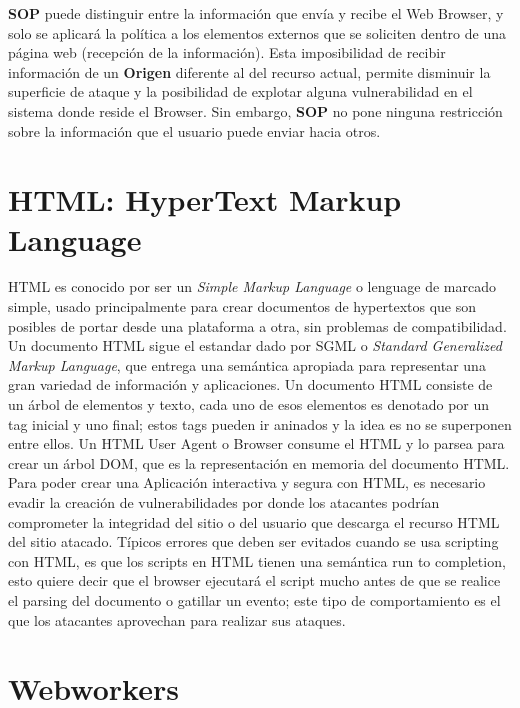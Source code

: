 \textbf{SOP} puede distinguir entre la información que envía y recibe el Web Browser, y solo se aplicará la política a los elementos externos que se soliciten dentro de una página web (recepción de la información). Esta imposibilidad de recibir información de un \textbf{Origen} diferente al del recurso actual, permite disminuir la superficie de ataque y la posibilidad de explotar alguna vulnerabilidad en el sistema donde reside el Browser. Sin embargo, \textbf{SOP} no pone ninguna restricción sobre la información que el usuario puede enviar hacia otros. 



\section{HTML: HyperText Markup Language}
\label{chap:HTML}
HTML \cite{htmlSpec} es conocido por ser un \textit{Simple Markup Language} o lenguage de marcado simple, usado principalmente para crear documentos de hypertextos que son posibles de portar desde una plataforma a otra, sin problemas de compatibilidad. Un documento HTML sigue el estandar dado por SGML o \textit{Standard Generalized Markup Language}, que entrega una semántica apropiada para representar una gran variedad de información y aplicaciones. Un documento HTML consiste de un árbol de elementos y texto, cada uno de esos elementos es denotado por un tag inicial y uno final; estos tags pueden ir aninados y la idea es no se superponen entre ellos. Un HTML User Agent o Browser consume el HTML y lo parsea para crear un árbol DOM, que es la representación en memoria del documento HTML.
Para poder crear una Aplicación interactiva y segura con HTML, es necesario evadir la creación de vulnerabilidades por donde los atacantes podrían comprometer la integridad del sitio o del usuario que descarga el recurso HTML del sitio atacado. Típicos errores que deben ser evitados cuando se usa scripting con HTML, es que los scripts en HTML tienen una semántica run to completion, esto quiere decir que el browser ejecutará el script mucho antes de que se realice el parsing del documento o gatillar un evento; este tipo de comportamiento es el que los atacantes aprovechan para realizar sus ataques.

\section{Webworkers}

\section{}

